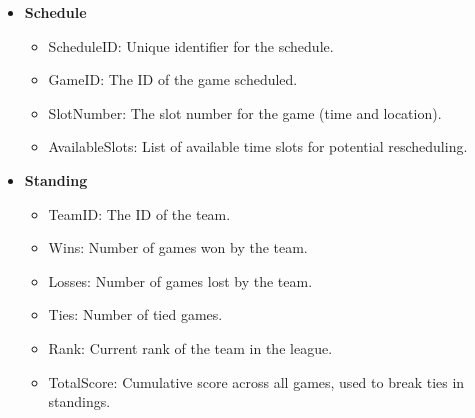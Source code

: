 \documentclass[12pt, titlepage]{article}
\begin{document}
\begin{itemize}
    \item \textbf{Schedule}
    \begin{itemize}
        \item ScheduleID: Unique identifier for the schedule.
        \item GameID: The ID of the game scheduled.
        \item SlotNumber: The slot number for the game (time and location).
        \item AvailableSlots: List of available time slots for potential rescheduling.
    \end{itemize}
    
    \item \textbf{Standing}
    \begin{itemize}
        \item TeamID: The ID of the team.
        \item Wins: Number of games won by the team.
        \item Losses: Number of games lost by the team.
        \item Ties: Number of tied games.
        \item Rank: Current rank of the team in the league.
        \item TotalScore: Cumulative score across all games, used to break ties in standings.
    \end{itemize}
\end{itemize}
\end{document}
